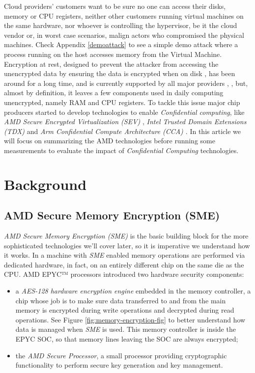 \documentclass[twocolumn]{article}
\begin{document}
Cloud providers' customers want to be sure no one can access their disks, memory or CPU registers, neither other customers running virtual machines on the same hardware, nor whoever is controlling the hypervisor, be it  the cloud vendor or, in worst case scenarios, malign actors who compromised the physical machines. Check Appendix \ref{demoattack} to see a simple demo attack where a process running on the host accesses memory from the Virtual Machine. Encryption at rest, designed to prevent the attacker from accessing the unencrypted data by ensuring the data is encrypted when on disk \cite{azure-enc}, has been around for a long time, and is currently supported by all major providers \cite{aws-enc}, \cite{gcp-enc}, \cite{azure-enc} but, almost by definition, it  leaves a few components used in daily computing unencrypted, namely RAM and CPU registers. To tackle this issue major chip producers started to develop technologies to enable \textit{Confidential computing}, like \textit{AMD Secure Encrypted Virtualization (SEV)} \cite{memory-encryption}, \textit{Intel Trusted Domain Extensions (TDX)} \cite{tdx} and \textit{Arm Confidential Compute Architecture (CCA) \cite{cca}}. In this article we will focus on summarizing the AMD technologies before running some measurements to evaluate the impact of \textit{Confidential Computing} technologies.

\section{Background}
\subsection{AMD Secure Memory Encryption (SME)}

\textit{AMD Secure Memory Encryption (SME)} is the basic building block for the more sophisticated technologies we'll cover later, so it is imperative we understand how it works. In a machine with \textit{SME} enabled memory operations are performed via dedicated hardware, in fact, on an entirely different chip on the same die as the CPU. AMD EPYC™ processors introduced two hardware security components:

\begin{itemize}
    \item a \textit{AES-128 hardware encryption engine} embedded in the memory controller, a chip whose job is to make sure data transferred to and from the main memory is encrypted during write operations and decrypted during read operations. See Figure \ref{fig:memory-encryption-fig} to better understand how data is managed when \textit{SME} is used. This memory controller is inside the EPYC SOC, so that memory lines leaving the SOC are always encrypted;
    \item the \textit{AMD Secure Processor}, a small processor providing cryptographic functionality to perform secure key generation and key management.
\end{itemize}
\end{document}
